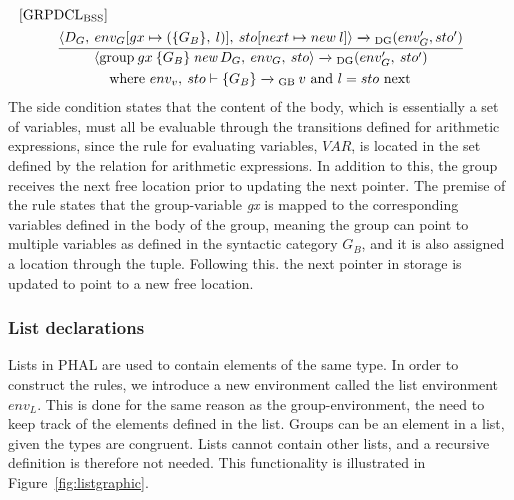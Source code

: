 \begin{equation}\label{rule:grpdclbss}
\begin{split}
\begin{minipage}{\linewidth}
$[\text{GRPDCL}_\text{BSS}]$
\end{minipage}
\\
\begin{minipage}{\linewidth}
\centering
$\cfrac{\langle D_G,  \: env_G[gx \mapsto (\{G_B\}, \: l)], \: sto[next \mapsto new \: l] \rangle \xrightarrow{}\textsubscript{DG} (env'_G, sto')}{\langle\text{group} \: gx \: \{G_B\} \: \textit{new} \: D_G, \: env_G, \: sto \rangle \xrightarrow{}\textsubscript{DG}(env'_G, \: sto')}$
\end{minipage}
\\
\begin{minipage}{\linewidth}
\centering
where $env_v, \: sto \vdash \{G_B\} \xrightarrow{}\textsubscript{GB} \: v \text{ and } l = sto \text{ next}$
\end{minipage}
\end{split}
\end{equation}
The side condition states that the content of the body, which is essentially a set of variables, must all be evaluable through the transitions defined for arithmetic expressions, since the rule for evaluating variables, $VAR$, is located in the set defined by the relation for arithmetic expressions. In addition to this, the group receives the next free location prior to updating the next pointer. 
The premise of the rule states that the group-variable \textit{gx} is mapped to the corresponding variables defined in the body of the group, meaning the group can point to multiple variables as defined in the syntactic category $G_B$, and it is also assigned a location through the tuple. Following this. the next pointer in storage is updated to point to a new free location.  


\subsubsection*{List declarations}
Lists in PHAL are used to contain elements of the same type. In order to construct the rules, we introduce a new environment called the list environment $env_L$. This is done for the same reason as the group-environment, the need to keep track of the elements defined in the list. Groups can be an element in a list, given the types are congruent. Lists cannot contain other lists, and a recursive definition is therefore not needed. This functionality is illustrated in Figure~\ref{fig:listgraphic}.

